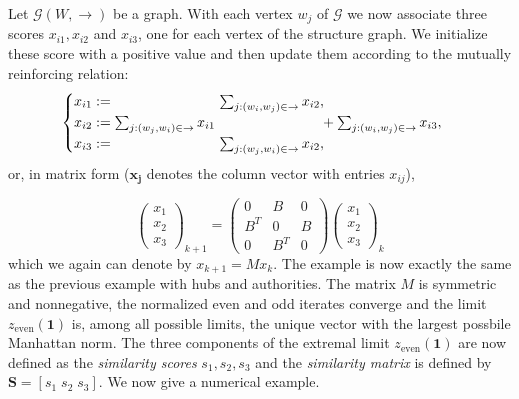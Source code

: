 \documentclass[a4paper,11pt]{report}
\newcommand{\graf}{\mathscr{G}}
\begin{document}
\begin{center}
\end{center}
Let $\graf(W,\to)$ be a graph. With each vertex $w_j$ of $\graf$ we now associate three scores $x_{i1}, x_{i2}$ and 
$x_{i3}$, one for each vertex of the structure graph. We initialize these score 
with a positive value and then update them according to the mutually reinforcing 
relation:
$$\begin{cases} x_{i1} := \hspace{75px} \sum_{j:(w_i,w_j)\in \to} x_{i2},\\ 
x_{i2} := \sum_{j:(w_j,w_i)\in \to} x_{i1}\hspace{75px} + \sum_{j:(w_i,w_j)\in \to} x_{i3},\\
x_{i3} := \hspace{75px}\sum_{j:(w_j,w_i)\in \to} x_{i2},
\end{cases}$$or, in matrix form ($\mathbf{x_j}$ denotes the column vector with entries $x_{ij}$),

$$\begin{pmatrix}
x_1\\
x_2\\
x_3
\end{pmatrix}_{k+1} = \begin{pmatrix}
0 & B & 0\\
B^T & 0 & B\\
0 & B^T & 0
\end{pmatrix}\begin{pmatrix}
x_1\\
x_2\\
x_3
\end{pmatrix}_{k}   $$ 
which we again can denote by $x_{k+1} = Mx_k$. The example is now exactly the 
same as the previous example with hubs and authorities. The matrix $M$ is 
symmetric and nonnegative, the normalized even and odd iterates converge and the 
limit  $z_{\text{even}}(\mathbf{1})$  is, among all possible limits, the unique 
vector with the largest possbile Manhattan norm. The three components of the 
extremal limit  $z_{\text{even}}(\mathbf{1})$ are now defined as the \textit{similarity 
scores} $s_1, s_2, s_3$ and the \textit{similarity matrix} is defined by $\mathbf{S} = [s_1\; s_2\; s_3].$ 
We now give a numerical example.
\end{document}
